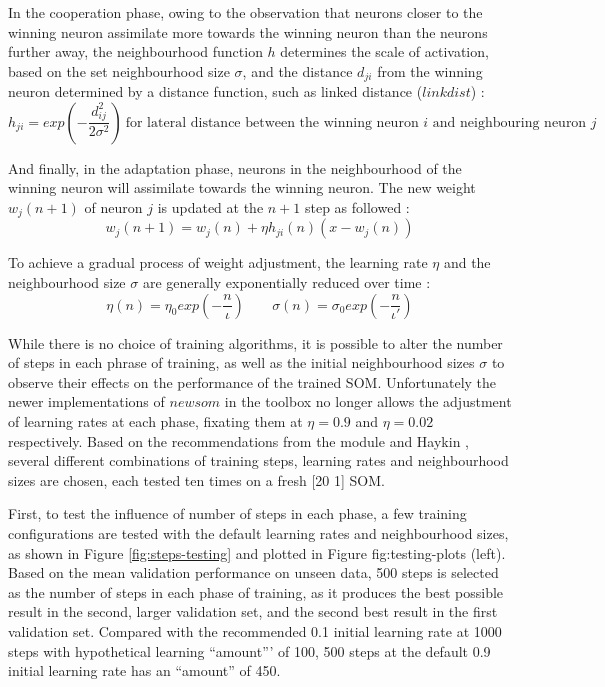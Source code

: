 \documentclass[10pt, oneside]{article}
\begin{document}
In the cooperation phase, owing to the observation that neurons closer to the winning neuron assimilate more towards the winning neuron than the neurons further away, the neighbourhood function $h$ determines the scale of activation, based on the set neighbourhood size $\sigma$, and the distance $d_{ji}$ from the winning neuron determined by a distance function, such as linked distance ($linkdist$) \cite[p. 431]{haykin2008}:
\begin{equation}
h_{ji} = exp(-\frac{d^2_{ij}}{2\sigma^2}) \ \text{for lateral distance between the winning neuron $i$ and neighbouring neuron $j$}
\end{equation}

And finally, in the adaptation phase, neurons in the neighbourhood of the winning neuron will assimilate towards the winning neuron. The new weight $w_j(n+1)$ of neuron $j$ is updated at the $n+1$ step as followed \cite[p. 21]{som-lecture}:
\begin{equation}
w_j(n+1) = w_j(n) + \eta h_{ji}(n)(x-w_j(n))
\end{equation}

To achieve a gradual process of weight adjustment, the learning rate $\eta$ and the neighbourhood size $\sigma$ are generally exponentially reduced over time \cite[pp. 21-22]{som-lecture}:
\begin{equation}
\eta (n) = \eta_0 exp(-\frac{n}{\iota}) \;\;\;\;\;\;\;  \sigma (n) = \sigma_0 exp(-\frac{n}{\iota'})
\end{equation}

While there is no choice of training algorithms, it is possible to alter the number of steps in each phrase of training, as well as the initial neighbourhood sizes $\sigma$ to observe their effects on the performance of the trained SOM. Unfortunately the newer implementations of $newsom$ in the toolbox no longer allows the adjustment of learning rates at each phase, fixating them at $\eta=0.9$ and $\eta=0.02$ respectively\cite{newsom-matlab}. Based on the recommendations from the module \cite{som-lecture} and Haykin \cite{haykin2008}, several different combinations of training steps, learning rates and neighbourhood sizes are chosen, each tested ten times on a fresh [20 1] SOM. 

First, to test the influence of number of steps in each phase, a few training configurations are tested with the default learning rates and neighbourhood sizes, as shown in Figure \ref{fig:steps-testing} and plotted in Figure {fig:testing-plots} (left). Based on the mean validation performance on unseen data, 500 steps is selected as the number of steps in each phase of training, as it produces the best possible result in the second, larger validation set, and the second best result in the first validation set. Compared with the recommended 0.1 initial learning rate at 1000 steps with hypothetical learning ``amount''' of 100, 500 steps at the default 0.9 initial learning rate has an ``amount'' of 450.
\end{document}
